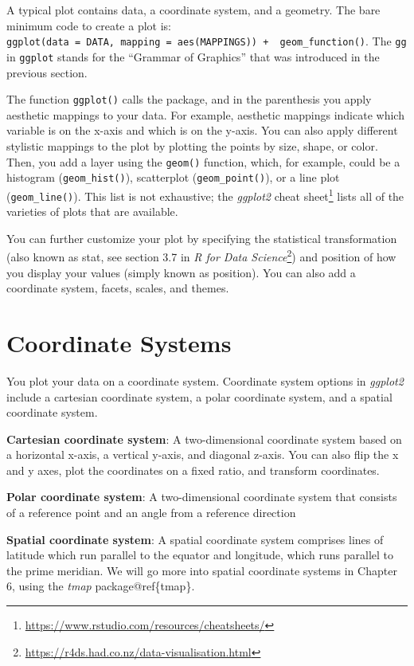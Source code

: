 \documentclass[
  krantz2]{krantz}
\begin{document}
A typical plot contains data, a coordinate system, and a geometry. The bare minimum code to create a plot is: \texttt{ggplot(data\ =\ DATA,\ mapping\ =\ aes(MAPPINGS))\ +\ \ geom\_function()}. The \texttt{gg} in \texttt{ggplot} stands for the ``Grammar of Graphics'' that was introduced in the previous section.

The function \texttt{ggplot()} calls the package, and in the parenthesis you apply aesthetic mappings to your data. For example, aesthetic mappings indicate which variable is on the x-axis and which is on the y-axis. You can also apply different stylistic mappings to the plot by plotting the points by size, shape, or color. Then, you add a layer using the \texttt{geom()} function, which, for example, could be a histogram (\texttt{geom\_hist()}), scatterplot (\texttt{geom\_point()}), or a line plot (\texttt{geom\_line()}). This list is not exhaustive; the \emph{ggplot2} cheat sheet\footnote{\url{https://www.rstudio.com/resources/cheatsheets/}} lists all of the varieties of plots that are available.

You can further customize your plot by specifying the statistical transformation (also known as stat, see section 3.7 in \emph{R for Data Science}\footnote{\url{https://r4ds.had.co.nz/data-visualisation.html}}) and position of how you display your values (simply known as position). You can also add a coordinate system, facets, scales, and themes.

\hypertarget{coordinate-systems}{%
\section{Coordinate Systems}\label{coordinate-systems}}

You plot your data on a coordinate system. Coordinate system options in \emph{ggplot2} include a cartesian coordinate system, a polar coordinate system, and a spatial coordinate system.

\textbf{Cartesian coordinate system}: A two-dimensional coordinate system based on a horizontal x-axis, a vertical y-axis, and diagonal z-axis. You can also flip the x and y axes, plot the coordinates on a fixed ratio, and transform coordinates.

\textbf{Polar coordinate system}: A two-dimensional coordinate system that consists of a reference point and an angle from a reference direction

\textbf{Spatial coordinate system}: A spatial coordinate system comprises lines of latitude which run parallel to the equator and longitude, which runs parallel to the prime meridian. We will go more into spatial coordinate systems in Chapter 6, using the \emph{tmap} package@ref\{tmap\}.
\end{document}
